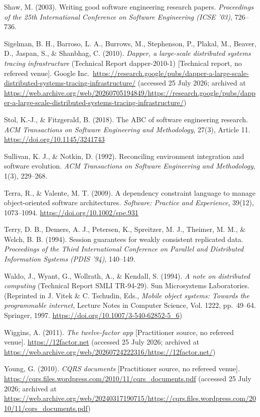 \documentclass[
]{article}
\begin{document}
Shaw, M. (2003). Writing good software engineering research papers.
\emph{Proceedings of the 25th International Conference on Software
Engineering (ICSE '03)}, 726--736.

Sigelman, B. H., Barroso, L. A., Burrows, M., Stephenson, P., Plakal,
M., Beaver, D., Jaspan, S., \& Shanbhag, C. (2010). \emph{Dapper, a
large-scale distributed systems tracing infrastructure} (Technical
Report dapper-2010-1) {[}Technical report, no refereed venue{]}. Google
Inc.~\url{https://research.google/pubs/dapper-a-large-scale-distributed-systems-tracing-infrastructure/}
(accessed 25 July 2026; archived at
\url{https://web.archive.org/web/20260705194849/https://research.google/pubs/dapper-a-large-scale-distributed-systems-tracing-infrastructure/})

Stol, K.-J., \& Fitzgerald, B. (2018). The ABC of software engineering
research. \emph{ACM Transactions on Software Engineering and
Methodology}, 27(3), Article 11. \url{https://doi.org/10.1145/3241743}

Sullivan, K. J., \& Notkin, D. (1992). Reconciling environment
integration and software evolution. \emph{ACM Transactions on Software
Engineering and Methodology}, 1(3), 229--268.

Terra, R., \& Valente, M. T. (2009). A dependency constraint language to
manage object-oriented software architectures. \emph{Software: Practice
and Experience}, 39(12), 1073--1094.
\url{https://doi.org/10.1002/spe.931}

Terry, D. B., Demers, A. J., Petersen, K., Spreitzer, M. J., Theimer, M.
M., \& Welch, B. B. (1994). Session guarantees for weakly consistent
replicated data. \emph{Proceedings of the Third International Conference
on Parallel and Distributed Information Systems (PDIS '94)}, 140--149.

Waldo, J., Wyant, G., Wollrath, A., \& Kendall, S. (1994). \emph{A note
on distributed computing} (Technical Report SMLI TR-94-29). Sun
Microsystems Laboratories. (Reprinted in J. Vitek \& C. Tschudin, Eds.,
\emph{Mobile object systems: Towards the programmable internet}, Lecture
Notes in Computer Science, Vol. 1222, pp.~49--64. Springer, 1997.
\url{https://doi.org/10.1007/3-540-62852-5_6})

Wiggins, A. (2011). \emph{The twelve-factor app} {[}Practitioner source,
no refereed venue{]}. \url{https://12factor.net} (accessed 25 July 2026;
archived at
\url{https://web.archive.org/web/20260724222316/https://12factor.net/})

Young, G. (2010). \emph{CQRS documents} {[}Practitioner source, no
refereed venue{]}.
\url{https://cqrs.files.wordpress.com/2010/11/cqrs_documents.pdf}
(accessed 25 July 2026; archived at
\url{https://web.archive.org/web/20240317190715/https://cqrs.files.wordpress.com/2010/11/cqrs_documents.pdf})
\end{document}
